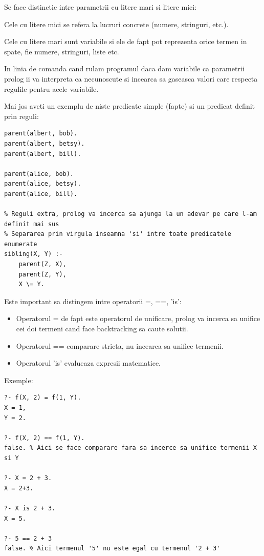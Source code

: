 \begin{note}
	Se face distinctie intre parametrii cu litere mari si litere mici:

	Cele cu litere mici se refera la lucruri concrete (numere, stringuri, etc.).

	Cele cu litere mari sunt variabile si ele de fapt pot reprezenta orice termen in spate, fie numere, stringuri, liste etc.

	In linia de comanda cand rulam programul daca dam variabile ca parametrii prolog ii va interpreta ca necunoscute si incearca sa gaseasca valori care respecta regulile pentru acele variabile.
\end{note}

Mai jos aveti un exemplu de niste predicate simple (fapte) si un predicat definit prin reguli:

\begin{lstlisting}[caption={Family relations in Prolog}]
% Cazurile de baza (oarecum ca la o functie recursiva)
parent(albert, bob).
parent(albert, betsy).
parent(albert, bill).

parent(alice, bob).
parent(alice, betsy).
parent(alice, bill).

% Reguli extra, prolog va incerca sa ajunga la un adevar pe care l-am definit mai sus
% Separarea prin virgula inseamna 'si' intre toate predicatele enumerate
sibling(X, Y) :-
    parent(Z, X),
    parent(Z, Y),
    X \= Y.
\end{lstlisting}

Este important sa distingem intre operatorii =, ==, 'is':
\begin{itemize}
	\item Operatorul = de fapt este operatorul de unificare, prolog va incerca sa unifice cei doi termeni cand face backtracking sa caute solutii.

	\item Operatorul == comparare stricta, nu incearca sa unifice termenii.

	\item Operatorul 'is' evalueaza expresii matematice.
\end{itemize}

Exemple:

\newpage

\begin{lstlisting}[caption={Distinctie operatorii in prolog}]
?- f(X, 2) = f(1, Y).
X = 1,
Y = 2.

?- f(X, 2) == f(1, Y).
false. % Aici se face comparare fara sa incerce sa unifice termenii X si Y

?- X = 2 + 3.
X = 2+3.

?- X is 2 + 3.
X = 5.

?- 5 == 2 + 3
false. % Aici termenul '5' nu este egal cu termenul '2 + 3'
\end{lstlisting}

